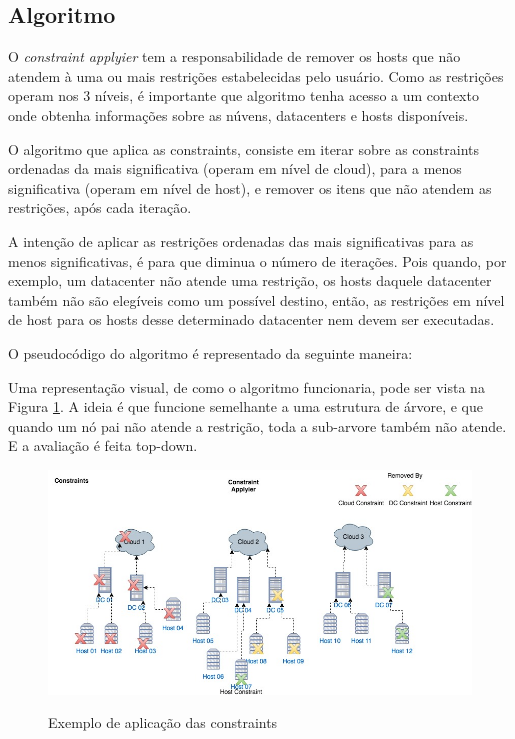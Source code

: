 \subsection{Algoritmo}
O \textit{constraint applyier} tem a responsabilidade de remover os hosts que não atendem à
uma ou mais restrições estabelecidas pelo usuário. Como as restrições operam nos 3 níveis,
é importante que algoritmo tenha acesso a um contexto onde obtenha informações sobre as núvens, 
datacenters e hosts disponíveis.

O algoritmo que aplica as constraints, consiste em iterar sobre as constraints ordenadas da mais significativa 
(operam em nível de cloud), para a menos significativa (operam em nível de host), e remover os itens que não atendem as
restrições, após cada iteração.

A intenção de aplicar as restrições ordenadas das mais significativas
para as menos significativas, é para que diminua o número de iterações.
Pois quando, por exemplo, um datacenter não atende uma restrição, os hosts daquele datacenter 
também não são elegíveis como um possível destino, então, as restrições em nível de host para
os hosts desse determinado datacenter nem devem ser executadas. 

O pseudocódigo do algoritmo é representado da seguinte maneira:



Uma representação visual, de como o algoritmo funcionaria, pode ser vista na 
Figura \ref{fig:constraintapplyier}. A ideia é que funcione semelhante a uma estrutura
de árvore, e que quando um nó pai não atende a restrição, toda a sub-arvore também não atende.
E a avaliação é feita top-down.

\begin{figure}[!htb]
  \centering
  \caption{Exemplo de aplicação das constraints}
  \includegraphics[width=1\textwidth]{./dados/figuras/constraintapplyier}
  \label{fig:constraintapplyier}
\end{figure}

